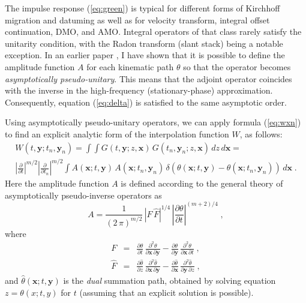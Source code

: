 The impulse response (\ref{eq:green}) is typical for different forms
of Kirchhoff migration and datuming as well as for velocity transform,
integral offset continuation, DMO, and AMO. Integral operators of that
class rarely satisfy the unitarity condition, with the Radon transform
(slant stack) being a notable exception. In an earlier paper
\cite[]{Fomel.sep.92.267}, I have shown that it is possible to define
the amplitude function $A$ for each kinematic path $\theta$ so that
the operator becomes \emph{asymptotically pseudo-unitary}. This means
that the adjoint operator coincides with the inverse in the
high-frequency (stationary-phase) approximation.  Consequently,
equation (\ref{eq:delta}) is satisfied to the same asymptotic order.

Using asymptotically pseudo-unitary operators, we can apply formula
(\ref{eq:wxn}) to find an explicit analytic form of the interpolation
function $W$, as follows:
\begin{eqnarray}
  \label{eq:apu}
  W (t, \mathbf{y}; t_n, \mathbf{y}_n) =  \int\!\!\int
  G (t, \mathbf{y}; z,\mathbf{x})\, G(t_n,\mathbf{y}_n;z,\mathbf{x})\,
  d z \, d \mathbf{x} =
  \nonumber \\
  \left|\frac{\partial}{\partial t}\right|^{m/2}
  \left|\frac{\partial}{\partial t_n}\right|^{m/2} \int
  A (\mathbf{x};t,\mathbf{y}) \, A (\mathbf{x};t_n,\mathbf{y}_n)\,
  \delta \left(\theta(\mathbf{x};t  ,\mathbf{y}  ) -
               \theta(\mathbf{x};t_n,\mathbf{y}_n) \right) \,
             d \mathbf{x}\;.
\end{eqnarray}
Here the amplitude function $A$ is defined according to the general
theory of asymptotically pseudo-inverse operators as
\begin{equation}
  \label{eq:weight}
  A = \frac{1}{\left(2\,\pi\right)^{m/2}} \,
\left|F\,\widehat{F}\right|^{1/4}\,
\left|\frac{\partial \theta}{\partial t}\right|^{(m+2)/4}\;,
\end{equation}
where
\begin{eqnarray}
F & = & \frac{\partial \theta}{\partial t}\,
\frac{\partial^2 \theta}{\partial \mathbf{x}\, \partial \mathbf{y}} -
\frac{\partial \theta}{\partial \mathbf{y}}\,
\frac{\partial^2 \theta}{\partial \mathbf{x}\, \partial t}\;,
 \\
\widehat{F} & = & \frac{\partial \widehat{\theta}}{\partial z}\,
\frac{\partial^2 \widehat{\theta}}{\partial \mathbf{x}\, \partial \mathbf{y}} -
\frac{\partial \widehat{\theta}}{\partial \mathbf{x}}\,
\frac{\partial^2 \widehat{\theta}}{\partial \mathbf{y}\, \partial z}\;,
\end{eqnarray}
and $\widehat{\theta} (\mathbf{x};t,\mathbf{y})$ is the \emph{dual}
summation path, obtained by solving equation $z=\theta(x;t,y)$ for $t$
(assuming that an explicit solution is possible).

